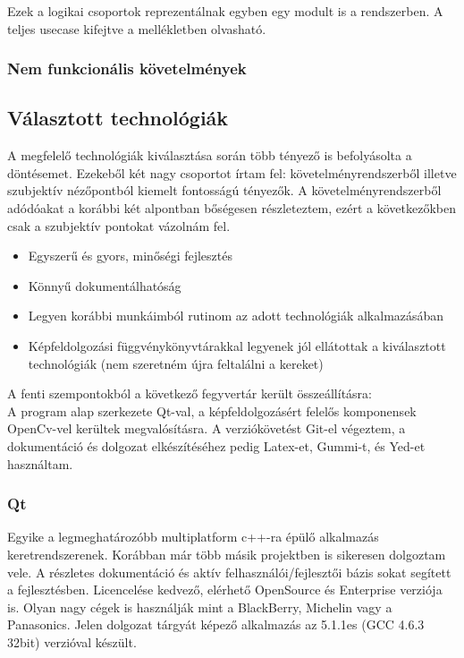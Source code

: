 \documentclass[a4paper,12pt,oneside]{report}
\begin{document}
Ezek a logikai csoportok reprezentálnak egyben egy modult is a rendszerben.
A teljes usecase kifejtve a mellékletben olvasható.

\subsubsection{Nem funkcionális követelmények}


\subsection{Választott technológiák}
A megfelelő technológiák kiválasztása során több tényező is befolyásolta a döntésemet. Ezekeből két nagy csoportot írtam fel: követelményrendszerből illetve szubjektív nézőpontból kiemelt fontosságú tényezők. A követelményrendszerből adódóakat a korábbi két alpontban bőségesen részleteztem, ezért a következőkben csak a szubjektív pontokat vázolnám fel.
\begin{itemize}
	\itemsep0em
	\item Egyszerű és gyors, minőségi fejlesztés
	\item Könnyű dokumentálhatóság
	\item Legyen korábbi munkáimból rutinom az adott technológiák alkalmazásában
	\item Képfeldolgozási függvénykönyvtárakkal legyenek jól ellátottak a kiválasztott technológiák (nem szeretném újra feltalálni a kereket)

\end{itemize}
A fenti szempontokból a következő fegyvertár került összeállításra:\\ A program alap szerkezete Qt-val, a képfeldolgozásért felelős komponensek OpenCv-vel kerültek megvalósításra. A verziókövetést Git-el végeztem, a dokumentáció és dolgozat elkészítéséhez pedig Latex-et, Gummi-t, és Yed-et használtam.
\subsubsection{Qt}
Egyike a legmeghatározóbb multiplatform c++-ra épülő alkalmazás keretrendszerenek. \cite{website:qt_about} Korábban már több másik projektben is sikeresen dolgoztam vele. A részletes dokumentáció és aktív felhasználói/fejlesztői bázis sokat segített a fejlesztésben. \cite{website:qt_dochome} \cite{website:qt_docforum}\cite{website:qt_docmaillist} Licencelése kedvező, elérhető OpenSource és Enterprise verziója is. Olyan nagy cégek is használják mint a BlackBerry, Michelin vagy a Panasonics.\cite{website:qt_in_use}  Jelen dolgozat tárgyát képező alkalmazás az 5.1.1es (GCC 4.6.3 32bit) verzióval készült.
\end{document}
